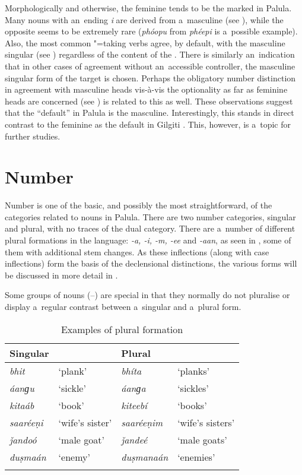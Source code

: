 Morphologically and otherwise, the feminine tends to be the marked  in Palula. Many nouns with an~ending \textit{i} are derived from a~masculine  (see ), while the opposite seems to be extremely rare (\textit{phóopu} from \textit{phéepi} is a~possible example). Also, the most common "=taking verbs agree, by default, with the masculine singular (see ) regardless of the content of the . There is similarly an~indication that in other cases of agreement without an~accessible controller, the masculine singular form of the target is chosen. Perhaps the obligatory number distinction in agreement with masculine heads vis-à-vis the optionality as far as feminine heads are concerned (see ) is related to this as well. These observations suggest that the ``default'' in Palula is the masculine. Interestingly, this stands in direct contrast to the feminine as the default  in Gilgiti \iliShina \citep[176]{hookzia2005}. This, however, is a~topic for further studies.

\section{Number}
\label{sec:4-4}

Number is one of the basic, and possibly the most straightforward, of the  categories related to nouns in Palula. There are two number categories, singular and plural, with no traces of the \iliOIA dual category. There are a~number of different plural formations in the language: \textit{-a, -i, -m, -ee} and \textit{-aan}, as seen in , some of them with additional stem changes. As these inflections (along with  case inflections) form the basis of the declensional distinctions, the various forms will be discussed in more detail in . 

Some groups of nouns (--) are special in that they normally do not pluralise or display a~regular contrast between a~singular and a~plural form.



\begin{table}[ht]
\caption{Examples of plural formation}
\begin{tabularx}{\textwidth}{ Q Q Q Q }
\lsptoprule
Singular &
&
Plural &
\\\midrule
\textit{bhit} &
`plank' &
\textit{bhíta} &
`planks'\\
\textit{áanɡu} &
`sickle' &
\textit{áanɡa} &
`sickles'\\
\textit{kitaáb} &
`book' &
\textit{kiteebí} &
`books'\\
\textit{saaréeṇi} &
`wife's sister' &
\textit{saaréeṇim} &
`wife's sisters'\\
\textit{ǰandoó} &
`male goat' &
\textit{ǰandeé} &
`male goats'\\
\textit{duṣmaán} &
`enemy' &
\textit{duṣmanaán} &
`enemies'\\\lspbottomrule
\end{tabularx}
\label{tab:4-5}
\end{table}

